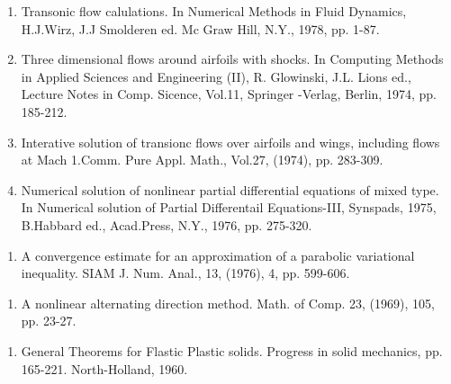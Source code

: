 \begin{thebibliography}{99}
 
  \begin{enumerate}
  \item Transonic flow calulations. In Numerical Methods in Fluid
 Dynamics, H.J.Wirz, J.J Smolderen ed. Mc Graw Hill, N.Y., 1978,
 pp. 1-87.\label{k59:e1} 
 
  \item Three dimensional flows around airfoils with shocks. In
 Computing Methods in Applied Sciences and Engineering (II),
 R. Glowinski, J.L. Lions ed., Lecture Notes in Comp. Sicence,
 Vol.11, Springer -Verlag, Berlin, 1974, pp. 185-212.\label{k59:e2} 
 
  \item Interative solution of transionc flows over airfoils and
 wings, including flows  at Mach 1.Comm. Pure Appl. Math., Vol.27,
 (1974), pp. 283-309.\label{k59:e3} 
 
  \item Numerical solution of nonlinear partial differential equations
 of mixed type. In Numerical solution of Partial Differentail
 Equations-III, Synspads, 1975, B.Habbard ed., Acad.Press, N.Y.,
 1976, pp. 275-320.\label{k59:e4} 
  \end{enumerate}

 \pageoriginale
 
  \begin{enumerate}
  \item A convergence estimate for an approximation of a parabolic
 variational inequality. SIAM J. Num. Anal., 13, (1976), 4,
 pp. 599-606.\label{k60:e1} 
  \end{enumerate}

  
  \begin{enumerate}
  \item A nonlinear alternating direction method. Math. of Comp. 23,
 (1969), 105, pp. 23-27.\label{k61:e1}
  \end{enumerate}
 
  
  \begin{enumerate}
  \item  General Theorems for Flastic Plastic solids. Progress in
 solid mechanics, pp. 165-221. North-Holland, 1960.\label{k62:e1} 
  \end{enumerate}

  

\end{thebibliography}
